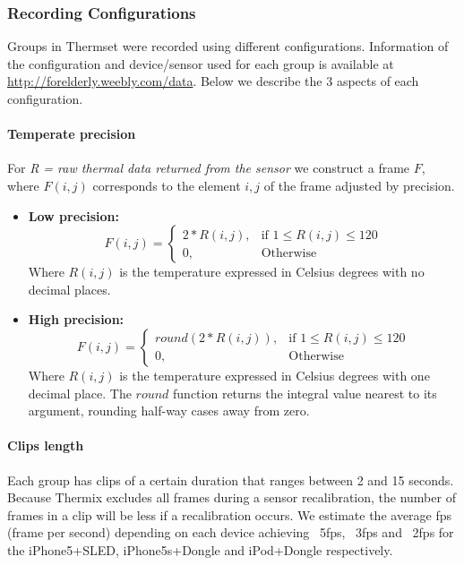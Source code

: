 \documentclass[oneside, twocolumn]{article}
\begin{document}
\subsubsection{Recording Configurations}
Groups in Thermset were recorded using different configurations. Information of the configuration and device/sensor used
for each group is available at \url{http://forelderly.weebly.com/data}. Below we describe the 3 aspects of each
configuration.

\paragraph{Temperate precision}
	For \textit{R = raw thermal data returned from the sensor} we construct a frame $F$, where $F(i,j)$ corresponds
  to the element $i,j$ of the frame adjusted by precision.

	\begin{itemize}
		\item \textbf{Low precision:}
			\[
			    F(i,j)=
			\begin{cases}
			    2 * R(i,j),		& \text{if } 1 \leq R(i,j) \leq 120\\
			    0,              & \text{Otherwise}
			\end{cases}
			\]
			Where $R(i,j)$ is the temperature expressed in Celsius degrees with no decimal places.\\


		\item \textbf{High precision:}
			\[
			    F(i,j)=
			\begin{cases}
			    round(2 * R(i,j)),		& \text{if } 1 \leq R(i,j) \leq 120\\
			    0,              & \text{Otherwise}
			\end{cases}
			\]
			Where $R(i,j)$ is the temperature expressed in Celsius degrees with one decimal place. The $round$
      function returns the integral value nearest to its argument, rounding half-way cases away from zero.
	\end{itemize}

\paragraph{Clips length}
Each group has clips of a certain duration that ranges between 2 and 15 seconds. Because Thermix excludes all frames
during a sensor recalibration, the number of frames in a clip will be less if a recalibration occurs. We estimate the average fps (frame per second)
depending on each device achieving ~5fps, ~3fps and ~2fps for the iPhone5+SLED, iPhone5s+Dongle and iPod+Dongle respectively.
\end{document}

